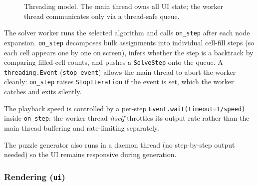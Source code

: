 \begin{figure}[h]
  \centering
  \caption{Threading model.  The main thread owns all UI state; the worker
           thread communicates only via a thread-safe queue.}
  \label{fig:threading}
\end{figure}

The solver worker runs the selected algorithm and calls \texttt{on\_step} after
each node expansion.
\texttt{on\_step} decomposes bulk assignments into individual cell-fill steps
(so each cell appears one by one on screen), infers whether the step is a
backtrack by comparing filled-cell counts, and pushes a \texttt{SolveStep}
onto the queue.
A \texttt{threading.Event} (\texttt{stop\_event}) allows the main thread to
abort the worker cleanly: \texttt{on\_step} raises \texttt{StopIteration} if
the event is set, which the worker catches and exits silently.

The playback speed is controlled by a per-step \texttt{Event.wait(timeout=1/speed)}
inside \texttt{on\_step}: the worker thread \emph{itself} throttles its output
rate rather than the main thread buffering and rate-limiting separately.

The puzzle generator also runs in a daemon thread (no step-by-step output
needed) so the UI remains responsive during generation.

\subsubsection{Rendering (\texttt{ui})}

